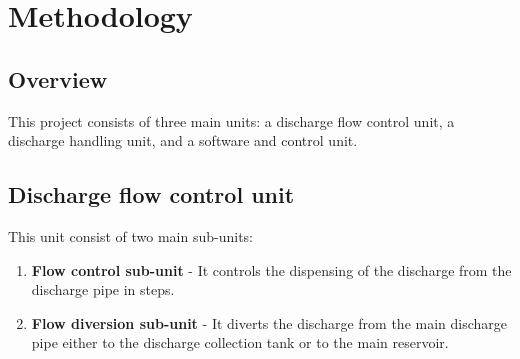 \section{Methodology}
\subsection{Overview}
This project consists of three main units: a discharge flow control unit, a discharge handling  unit, and a software and control unit. 
\subsection{Discharge flow control unit}
This unit consist of two main sub-units:
\begin{enumerate}
    \item \textbf{Flow control sub-unit} -
   It controls the dispensing of the discharge from the discharge pipe in steps.
    \item \textbf{Flow diversion sub-unit} -
    It diverts the discharge from the main discharge pipe either to the discharge collection tank or to the main reservoir.
\end{enumerate}
\par
